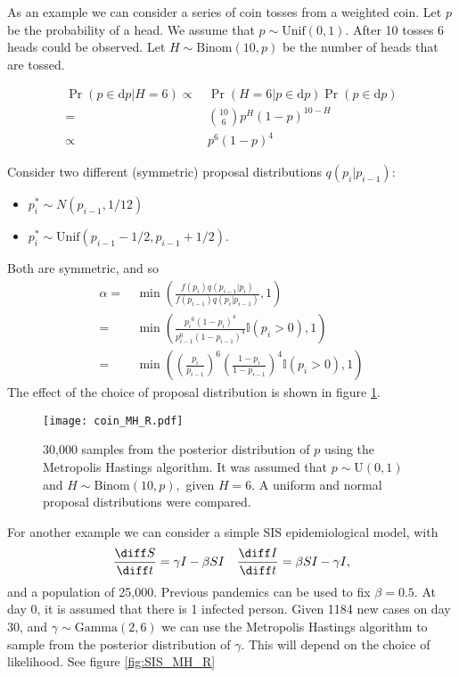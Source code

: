 As an example we can consider a series of coin tosses from a weighted coin. Let $p$ be the probability of a head. We assume that $p\sim\mathrm{Unif}(0,1).$ After 10 tosses 6 heads could be observed. Let $H\sim\mathrm{Binom}(10, p)$ be the number of heads that are tossed.

\begin{align*}
    \Pr(p\in\mathrm{d}p| H= 6)\propto&\, \Pr(H= 6|p\in\mathrm{d}p)\Pr(p\in\mathrm{d}p)\\
    =&\, {10 \choose 6} p^H(1 - p)^{10 - H}\\
    \propto&\, p^6(1 - p)^{4}
\end{align*}

Consider two different (symmetric) proposal distributions $q(p_i|p_{i - 1})$: \begin{itemize}
    \item $p_i^* \sim N(p_{i - 1}, 1/12)$
    \item $p_i^* \sim \mathrm{Unif}(p_{i - 1} - 1/2, p_{i - 1} + 1/2)$.
\end{itemize} Both are symmetric, and so \begin{align*}
    \alpha =&\, \min\left(\frac{f(p_i)q(p_{i - 1}|p_{i})}{f(p_{i - 1})q(p_i|p_{i - 1})}, 1\right)\\
    =&\, \min\left(\frac{{p_i}^{6}(1 - p_i)^4}{p_{i - 1}^6(1 - p_{i - 1})^4}\mathbb{I}(p_i > 0), 1\right)\\
    =&\, \min\left(\left(\frac{p_i}{p_{i - 1}}\right)^{6}\left(\frac{1 - p_i}{1 - p_{i - 1}}\right)^4\mathbb{I}(p_i > 0), 1\right)
\end{align*} The effect of the choice of proposal distribution is shown in figure \ref{fig:coin_R}.

\begin{figure}[ht]
    \centering
    \texttt{[image: coin\_MH\_R.pdf]}
    \caption{30,000 samples from the posterior distribution of $p$ using the Metropolis Hastings algorithm. It was assumed that $p\sim \mathrm{U}(0,1)$ and $H \sim \mathrm{Binom}(10, p),$ given $H = 6.$ A uniform and normal proposal distributions were compared.}
    \label{fig:coin_R}
\end{figure}

For another example we can consider a simple SIS epidemiological model, with $$\frac{\diff S}{\diff t} = \gamma I - \beta SI \quad \frac{\diff I}{\diff t} = \beta SI -  \gamma I,$$ and a population of 25,000. Previous pandemics can be used to fix $\beta = 0.5.$ At day 0, it is assumed that there is 1 infected person. Given 1184 new cases on day 30, and $\gamma\sim \mathrm{Gamma}(2, 6)$ we can use the Metropolis Hastings algorithm to sample from the posterior distribution of $\gamma.$  This will depend on the choice of likelihood. See figure \ref{fig:SIS_MH_R}

